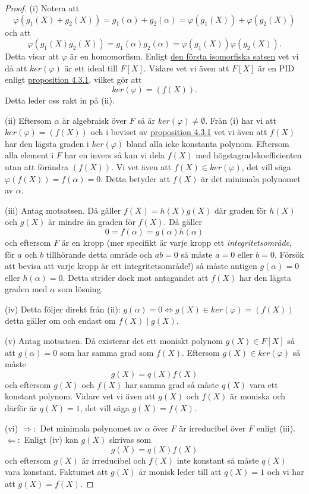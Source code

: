 \documentclass{article}
\theoremstyle{definition}
\begin{document}
\begin{proof}
  (i) Notera att 
  \[\varphi(g_1(X) + g_2(X)) = g_1(\alpha) + g_2(\alpha) = \varphi(g_1(X)) + \varphi(g_2(X))\]
  och att 
  \[\varphi(g_1(X) g_2(X)) = g_1(\alpha) g_2(\alpha) = \varphi(g_1(X)) \varphi(g_2(X)).\]
  Detta visar att $\varphi$ är en homomorfism. Enligt \hyperlink{isomorfiska}{den första isomorfiska satsen} vet vi då att $ker(\varphi)$ är ett ideal 
  till $F[X]$. Vidare vet vi även att $F[X]$ är en PID enligt \hyperlink{pid}{proposition 4.3.1}, vilket gör att 
  \[ker(\varphi) = (f(X)).\]
  Detta leder oss rakt in på (ii).

  (ii) Eftersom $\alpha$ är algebraisk över $F$ så är $ker(\varphi) \neq \emptyset$. Från (i) har vi att $ker(\varphi) = (f(X))$
  och i beviset av \hyperlink{pid}{proposition 4.3.1} vet vi även att $f(X)$ har den lägsta graden i $ker(\varphi)$ bland alla icke konstanta polynom. 
  Eftersom alla element i $F$ har en invers så kan vi dela $f(X)$ med högstagradskoefficienten utan att förändra $(f(X))$. Vi vet även att 
  $f(X) \in ker(\varphi)$, det vill säga $\varphi(f(X)) = f(\alpha) = 0$. Detta betyder att $f(X)$ är det minimala polynomet av $\alpha$.

  (iii) Antag motsatsen. Då gäller $f(X) = h(X)g(X)$ där graden för $h(X)$ och $g(X)$ är mindre än graden för $f(X)$. Då gäller 
  \[0 = f(\alpha) = g(\alpha) h(\alpha)\]
  och eftersom $F$ är en kropp (mer specifikt är varje kropp ett \textit{integritetsområde}, för $a$ och $b$ tillhörande detta område och 
  $ab = 0$ så måste $a = 0$ eller $b = 0$. Försök att bevisa att varje kropp är ett integritetsområde!) så måste antigen 
  $g(\alpha) = 0$ eller $h(\alpha) = 0$. Detta strider dock mot antagandet att $f(X)$ har den lägsta graden med $\alpha$ som lösning. 

  (iv) Detta följer direkt från (ii): $g(\alpha) = 0 \iff g(X) \in ker(\varphi) = (f(X))$ detta gäller om och endast om $f(X) \; | \; g(X).$ 
  
  (v) Antag motsatsen. Då existerar det ett moniskt polynom $g(X) \in F[X]$ så att $g(\alpha) = 0$ som har samma grad som $f(X)$. 
  Eftersom $g(X) \in ker(\varphi)$ så måste 
  \[g(X) = q(X) f(X)\]
  och eftersom $g(X)$ och $f(X)$ har samma grad så måste $q(X)$ vara ett konstant polynom. Vidare vet vi även att $g(X)$ och $f(X)$ är moniska 
  och därför är $q(X) = 1$, det vill säga $g(X) = f(X)$.

  (vi) $\Rightarrow:$ Det minimala polynomet av $\alpha$ över $F$ är irreducibel över $F$ enligt (iii). 
  $\Leftarrow:$ Enligt (iv) kan $g(X)$ skrivas som 
  \[g(X) = q(X)f(X)\]
  och eftersom $g(X)$ är irreducibel och $f(X)$ inte konstant så måste $q(X)$ vara konstant. Faktumet att $g(X)$ är monisk leder till att 
  $q(X) = 1$ och vi har att $g(X) = f(X).$
\end{proof}
\end{document}
